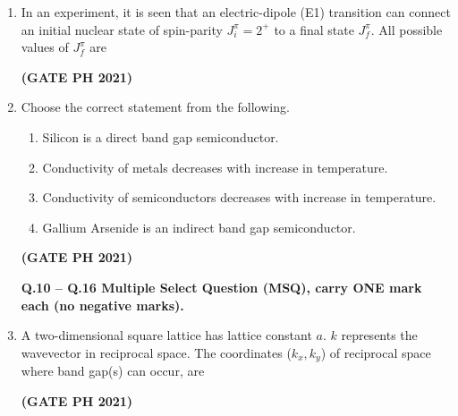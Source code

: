 \documentclass[14pt, a4paper]{extarticle}
\begin{document}
\begin{enumerate}[label=\textbf{Q.\arabic*}]
\begin{enumerate}[label=\textbf{Q.\arabic*}]
\item In an experiment, it is seen that an electric-dipole (E1) transition can connect an initial nuclear state of spin-parity $J_i^{\pi} = 2^+$ to a final state $J_f^{\pi}$. All possible values of $J_f^{\pi}$ are
\begin{enumerate}
\end{enumerate}
\hfill \textbf{(GATE PH 2021)}

\item Choose the correct statement from the following.
\begin{enumerate}
\item Silicon is a direct band gap semiconductor.
\item Conductivity of metals decreases with increase in temperature.
\item Conductivity of semiconductors decreases with increase in temperature.
\item Gallium Arsenide is an indirect band gap semiconductor.
\end{enumerate}
\hfill \textbf{(GATE PH 2021)}

\textbf{Q.10 – Q.16 Multiple Select Question (MSQ), carry ONE mark each (no negative marks).}

\item A two-dimensional square lattice has lattice constant $a$. $k$ represents the wavevector in reciprocal space. The coordinates ($k_x, k_y$) of reciprocal space where band gap(s) can occur, are
\begin{enumerate}
\end{enumerate}
\hfill \textbf{(GATE PH 2021)}


\end{enumerate}
\end{enumerate}
\end{document}
